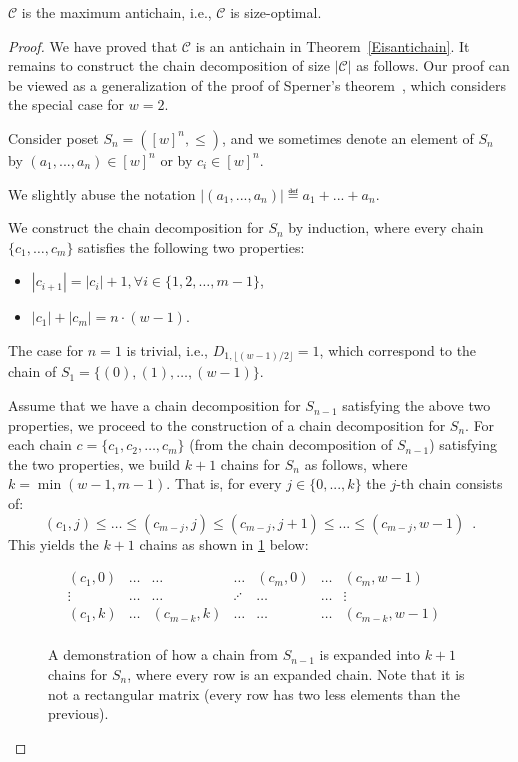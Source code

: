 \begin{theorem}\label{maximum-antichain}
    $\mathcal{C}$ is the maximum antichain, i.e., $\mathcal{C}$ is size-optimal.
\end{theorem}


\begin{proof}
    We have proved that $\mathcal{C}$ is an antichain in Theorem~\ref{Eisantichain}. It remains to construct the chain decomposition of size $|\mathcal{C}|$ as follows. Our proof can be viewed as a generalization of the proof of Sperner's theorem~\cite{sperner1928satz}, which considers the special case for $w=2$.  
    
    Consider poset $S_n=([w]^n,\leq)$, and we sometimes denote an element of $ S_n $ by $(a_1, ..., a_n)\in [w]^n$ or by $c_i\in [w]^n$.  We slightly abuse the notation $|(a_1, ..., a_n)| \eqdef a_1 + ... + a_n$.
    
    We construct the chain decomposition for $S_n$ by induction, where every chain $\{c_1,\ldots, c_{m}\}$ satisfies the following two properties:
    \begin{itemize}
        \item $|c_{i+1}| = |c_i| + 1, \forall i \in \{1,2,\dots,m-1\}$,
        \item $|c_1| + |c_{m}| = n \cdot (w-1)$.
    \end{itemize} 
    
    The case for $n=1$ is trivial, i.e., $D_{1, \lfloor{(w-1)/2}\rfloor} = 1$, which correspond to the  chain of $S_1=\{(0), (1), \ldots,  (w-1)\}$.  
    
Assume that we have a chain decomposition for $S_{n-1}$ satisfying the above two properties, we proceed to the construction of a chain decomposition for $S_{n}$. For each chain $c=\{c_{1}, c_{2}, \ldots, c_{m}\}$ (from the chain decomposition of $S_{n-1}$) satisfying the two properties, we build $k+1$ chains for  $S_{n}$ as follows, where $k = \min(w-1, m - 1)$. 
That is, for every $j\in\{0,...,k\}$ the $j$-th chain  consists of:
$$ (c_{1}, j) \le \ldots \le (c_{m - j}, j) \le (c_{m - j}, j+1) \le ... \le (c_{m - j}, w-1) \enspace .$$
This yields the  $k+1$ chains 
as shown in \cref{fig:induction} below:
       
\begin{figure}[ht]
\centering
    $$ 
    \begin{matrix}
    (c_{1},0) & \ldots & \ldots  & \ldots & (c_{m},0) & \ldots & (c_{m},w-1) &  \\ 
   \vdots  & \ldots & \ldots & \iddots & \ldots & \ldots &  \vdots & \\
     (c_{1},k) & \ldots &  (c_{m-k},k) & \ldots & \ldots & \ldots &  (c_{m-k},w-1)  &\\
    \end{matrix}
    $$
\caption{A demonstration of how a chain from $S_{n-1}$ is expanded into $k+1$ chains for $S_n$, where every row is an expanded chain. Note that it is not a rectangular matrix (every row has two less elements than the previous).}
\label{fig:induction}
\end{figure}
       

\end{proof}
